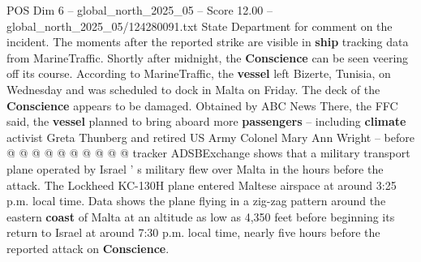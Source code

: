 \begin{textsample}{POS Dim 6 – global\_north\_2025\_05 – Score 12.00 – global\_north\_2025\_05/124280091.txt}
State Department for comment on the incident.
The moments after the reported strike are visible in \textbf{ship} tracking data from MarineTraffic.
Shortly after midnight, the \textbf{Conscience} can be seen veering off its course.
According to MarineTraffic, the \textbf{vessel} left Bizerte, Tunisia, on Wednesday and was scheduled to dock in Malta on Friday.
The deck of the \textbf{Conscience} appears to be damaged.
Obtained by ABC News There, the FFC said, the \textbf{vessel} planned to bring aboard more \textbf{passengers} -- including \textbf{climate} activist Greta Thunberg and retired US Army Colonel Mary Ann Wright -- before @ @ @ @ @ @ @ @ @ @ tracker ADSBExchange shows that a military transport plane operated by Israel ' s military flew over Malta in the hours before the attack.
The Lockheed KC-130H plane entered Maltese airspace at around 3:25 p.m. local time.
Data shows the plane flying in a zig-zag pattern around the eastern \textbf{coast} of Malta at an altitude as low as 4,350 feet before beginning its return to Israel at around 7:30 p.m. local time, nearly five hours before the reported attack on \textbf{Conscience}.

\end{textsample}
